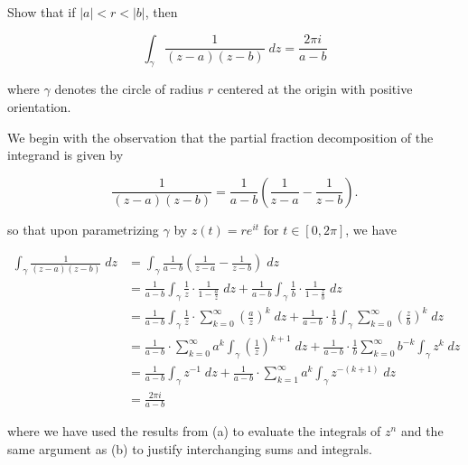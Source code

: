 Show that if $|a| < r < |b|$, then 

$$
\int_{\gamma} \frac{1}{(z - a)(z - b)} \; dz = \frac{2 \pi i}{a - b}
$$

where $\gamma$ denotes the circle of radius $r$ centered at the origin with positive orientation.

\begin{solution}
    We begin with the observation that the partial fraction decomposition of the integrand is given by

    $$
    \frac{1}{(z - a)(z - b)} = \frac{1}{a - b} \left( \frac{1}{z - a} - \frac{1}{z - b} \right).
    $$

    so that upon parametrizing $\gamma$ by $z(t) = re^{it}$ for $t \in [0, 2 \pi]$, we have

    \begin{align*}
        \int_{\gamma} \frac{1}{(z - a)(z - b)} \; dz &= \int_{\gamma} \frac{1}{a - b} \left( \frac{1}{z - a} - \frac{1}{z - b} \right) \; dz \\
                                                     &= \frac{1}{a - b} \int_{\gamma} \frac{1}{z} \cdot \frac{1}{1 - \frac{a}{z}} \; dz 
                                                      + \frac{1}{a - b} \int_{\gamma} \frac{1}{b} \cdot \frac{1}{1 - \frac{z}{b}} \; dz \\
                                                     &= \frac{1}{a - b} \int_{\gamma} \frac{1}{z} \cdot \sum\limits_{k=0}^{\infty} \left(\frac{a}{z}\right)^k \; dz 
                                                      + \frac{1}{a - b} \cdot \frac{1}{b} \int_{\gamma} \sum\limits_{k=0}^{\infty} \left(\frac{z}{b}\right)^k \; dz \\
                                                     &= \frac{1}{a - b} \cdot \sum\limits_{k=0}^{\infty} a^k \int_{\gamma} \left(\frac{1}{z}\right)^{k+1} \; dz 
                                                      + \frac{1}{a - b} \cdot \frac{1}{b} \sum\limits_{k=0}^{\infty} b^{-k} \int_{\gamma} z^k \; dz \\
                                                     &= \frac{1}{a - b} \int_{\gamma} z^{-1} \; dz 
                                                      + \frac{1}{a - b} \cdot \sum\limits_{k=1}^{\infty} a^k \int_{\gamma} z^{-(k+1)} \; dz \\
                                                     &= \frac{2 \pi i}{a - b} 
    \end{align*}

    where we have used the results from (a) to evaluate the integrals of $z^n$ and the same argument as (b) to justify 
    interchanging sums and integrals.
    \ \\
\end{solution}